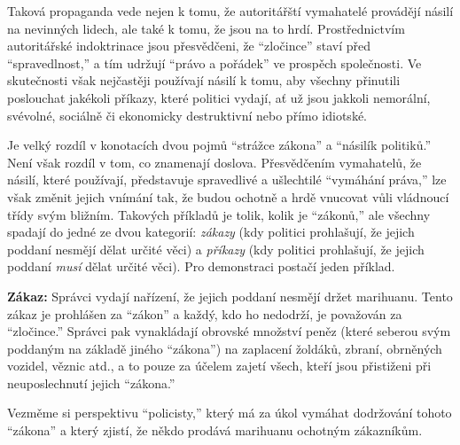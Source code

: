\documentclass{book}
\begin{document}
Taková propaganda vede nejen k tomu, že autoritářští vymahatelé provádějí násilí na nevinných lidech, ale také k tomu, že jsou na to hrdí. Prostřednictvím autoritářské indoktrinace jsou přesvědčeni, že \enquote{zločince} staví před \enquote{spravedlnost,} a tím udržují \enquote{právo a pořádek} ve prospěch společnosti. Ve skutečnosti však nejčastěji používají násilí k tomu, aby všechny přinutili poslouchat jakékoli příkazy, které politici vydají, ať už jsou jakkoli nemorální, svévolné, sociálně či ekonomicky destruktivní nebo přímo idiotské.

Je velký rozdíl v konotacích dvou pojmů \enquote{strážce zákona} a \enquote{násilík politiků.} Není však rozdíl v tom, co znamenají doslova. Přesvědčením vymahatelů, že násilí, které používají, představuje spravedlivé a ušlechtilé \enquote{vymáhání práva,} lze však změnit jejich vnímání tak, že budou ochotně a hrdě vnucovat vůli vládnoucí třídy svým bližním. Takových příkladů je tolik, kolik je \enquote{zákonů,} ale všechny spadají do jedné ze dvou kategorií: \emph{zákazy} (kdy politici prohlašují, že jejich poddaní nesmějí dělat určité věci) a \emph{příkazy} (kdy politici prohlašují, že jejich poddaní \emph{musí} dělat určité věci). Pro demonstraci postačí jeden příklad.

\textbf{Zákaz:} Správci vydají nařízení, že jejich poddaní nesmějí držet marihuanu. Tento zákaz je prohlášen za \enquote{zákon} a každý, kdo ho nedodrží, je považován za \enquote{zločince.} Správci pak vynakládají obrovské množství peněz (které seberou svým poddaným na základě jiného \enquote{zákona}) na zaplacení žoldáků, zbraní, obrněných vozidel, věznic atd., a to pouze za účelem zajetí všech, kteří jsou přistiženi při neuposlechnutí jejich \enquote{zákona.}

Vezměme si perspektivu \enquote{policisty,} který má za úkol vymáhat dodržování tohoto \enquote{zákona} a který zjistí, že někdo prodává marihuanu ochotným zákazníkům.
\end{document}

